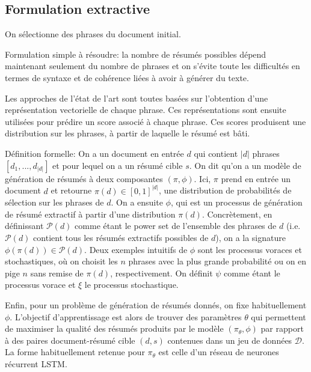 \subsection{Formulation extractive}
\label{sec:extractive}

On sélectionne des phrases du document initial.

Formulation simple à résoudre: la nombre de résumés possibles dépend maintenant seulement
du nombre de phrases et on s'évite toute les difficultés en termes de syntaxe
et de cohérence liées à avoir à générer du texte.

Les approches de l'état de l'art sont toutes basées sur l'obtention
d'une représentation vectorielle de chaque phrase.
Ces représentations sont ensuite utilisées pour prédire un score
associé à chaque phrase.
Ces scores produisent une distribution sur les phrases, à partir
de laquelle le résumé est bâti.

Définition formelle: On a un document en entrée $d$ qui contient $|d|$ phrases $[d_1, ..., d_{|d|}]$
et pour lequel on a un résumé cible $s$.
On dit qu'on a un modèle de génération de résumés à deux composantes $(\pi, \phi)$.
Ici, $\pi$ prend en entrée un document $d$ et retourne
$\pi(d) \in [0, 1]^{|d|}$, une distribution de probabilités de sélection sur les phrases
de $d$.
On a ensuite $\phi$, qui est un processus de génération de résumé
extractif à partir d'une distribution $\pi(d)$.
Concrètement, en définissant $\mathscr{P}(d)$ comme étant le power set de l'ensemble
des phrases de $d$ (i.e. $\mathscr{P}(d)$ contient tous les résumés extractifs possibles
de $d$), on a la signature $\phi(\pi(d)) \in \mathscr{P}(d)$.
Deux exemples intuitifs de $\phi$ sont les processus voraces et stochastiques,
où on choisit les $n$ phrases avec la plus grande probabilité ou on en pige
$n$ sans remise de $\pi(d)$, respectivement.
On définit $\psi$ comme étant le processus vorace et $\xi$ le processus stochastique.

Enfin, pour un problème de génération de résumés donnés, on fixe habituellement $\phi$.
L'objectif d'apprentissage est alors de trouver des paramètres $\theta$
qui permettent de maximiser la qualité des résumés produits par le modèle
$(\pi_\theta, \phi)$ par rapport à des paires document-résumé cible $(d, s)$ contenues
dans un jeu de données $\mathcal{D}$.
La forme habituellement retenue pour $\pi_\theta$ est celle d'un réseau de neurones
récurrent LSTM.

